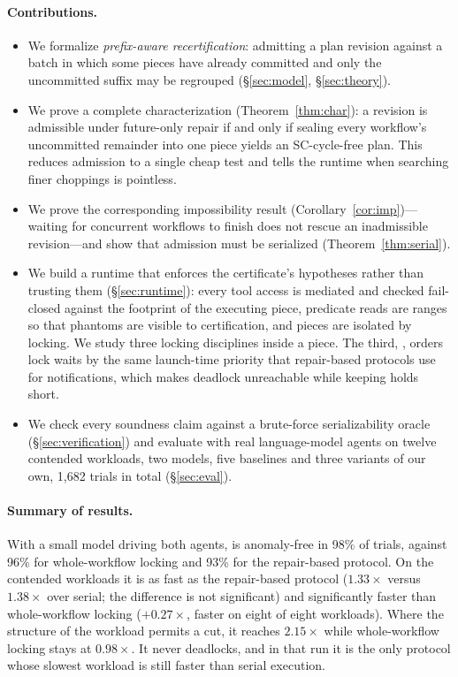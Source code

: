 \paragraph{Contributions.}
\begin{itemize}
\item We formalize \emph{prefix-aware recertification}: admitting a plan
  revision against a batch in which some pieces have already committed and
  only the uncommitted suffix may be regrouped (\S\ref{sec:model},
  \S\ref{sec:theory}).
\item We prove a complete characterization (Theorem~\ref{thm:char}): a
  revision is admissible under future-only repair if and only if sealing
  every workflow's uncommitted remainder into one piece yields an
  SC-cycle-free plan. This reduces admission to a single cheap test and tells
  the runtime when searching finer choppings is pointless.
\item We prove the corresponding impossibility result
  (Corollary~\ref{cor:imp})---waiting for concurrent workflows to finish does
  not rescue an inadmissible revision---and show that admission must be
  serialized (Theorem~\ref{thm:serial}).
\item We build a runtime that enforces the certificate's hypotheses rather
  than trusting them (\S\ref{sec:runtime}): every tool access is mediated and
  checked fail-closed against the footprint of the executing piece, predicate
  reads are ranges so that phantoms are visible to certification, and pieces
  are isolated by locking. We study three locking disciplines inside a piece.
  The third, \ccs, orders lock waits by the same launch-time priority that
  repair-based protocols use for notifications, which makes deadlock
  unreachable while keeping holds short.
\item We check every soundness claim against a brute-force serializability
  oracle (\S\ref{sec:verification}) and evaluate with real language-model
  agents on twelve contended workloads, two models, five baselines and
  three variants of our own, 1{,}682 trials in total (\S\ref{sec:eval}).
\end{itemize}

\paragraph{Summary of results.}
With a small model driving both agents, \ccs is anomaly-free in 98\% of
trials, against 96\% for whole-workflow locking and 93\% for the repair-based
protocol. On the contended workloads it is as fast as the repair-based
protocol ($1.33\times$ versus $1.38\times$ over serial; the difference is
not significant) and significantly faster than whole-workflow locking
($+0.27\times$, faster on eight of eight workloads). Where the structure of
the workload permits a cut, it reaches $2.15\times$ while whole-workflow
locking stays at $0.98\times$. It never deadlocks, and in that run it is the
only protocol whose slowest workload is still faster than serial execution.

